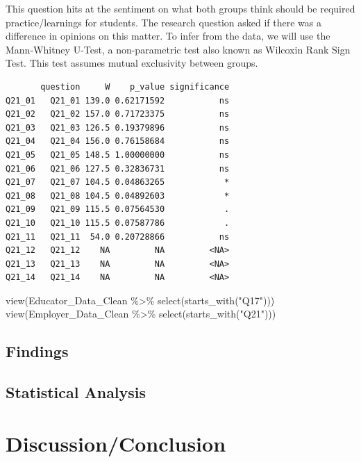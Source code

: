 \documentclass[
  11pt,
  letterpaper,
  DIV=11,
  numbers=noendperiod]{scrartcl}
\newenvironment{Shaded}{\begin{snugshade}}{\end{snugshade}}
\newcommand{\FunctionTok}[1]{\textcolor[rgb]{0.28,0.35,0.67}{#1}}
\newcommand{\NormalTok}[1]{\textcolor[rgb]{0.00,0.23,0.31}{#1}}
\newcommand{\SpecialCharTok}[1]{\textcolor[rgb]{0.37,0.37,0.37}{#1}}
\newcommand{\StringTok}[1]{\textcolor[rgb]{0.13,0.47,0.30}{#1}}
\numberwithin{figure}{section}
\begin{document}
This question hits at the sentiment on what both groups think should be
required practice/learnings for students. The research question asked if
there was a difference in opinions on this matter. To infer from the
data, we will use the Mann-Whitney U-Test, a non-parametric test also
known as Wilcoxin Rank Sign Test. This test assumes mutual exclusivity
between groups.

\begin{verbatim}
       question     W    p_value significance
Q21_01   Q21_01 139.0 0.62171592           ns
Q21_02   Q21_02 157.0 0.71723375           ns
Q21_03   Q21_03 126.5 0.19379896           ns
Q21_04   Q21_04 156.0 0.76158684           ns
Q21_05   Q21_05 148.5 1.00000000           ns
Q21_06   Q21_06 127.5 0.32836731           ns
Q21_07   Q21_07 104.5 0.04863265            *
Q21_08   Q21_08 104.5 0.04892603            *
Q21_09   Q21_09 115.5 0.07564530            .
Q21_10   Q21_10 115.5 0.07587786            .
Q21_11   Q21_11  54.0 0.20728866           ns
Q21_12   Q21_12    NA         NA         <NA>
Q21_13   Q21_13    NA         NA         <NA>
Q21_14   Q21_14    NA         NA         <NA>
\end{verbatim}

\begin{Shaded}
\begin{Highlighting}[]
\FunctionTok{view}\NormalTok{(Educator\_Data\_Clean }\SpecialCharTok{\%\textgreater{}\%} \FunctionTok{select}\NormalTok{(}\FunctionTok{starts\_with}\NormalTok{(}\StringTok{"Q17"}\NormalTok{)))}
\FunctionTok{view}\NormalTok{(Employer\_Data\_Clean }\SpecialCharTok{\%\textgreater{}\%} \FunctionTok{select}\NormalTok{(}\FunctionTok{starts\_with}\NormalTok{(}\StringTok{"Q21"}\NormalTok{)))}
\end{Highlighting}
\end{Shaded}

\subsection{Findings}\label{findings}

\subsection{Statistical Analysis}\label{statistical-analysis}

\section{Discussion/Conclusion}\label{discussionconclusion}
\end{document}
